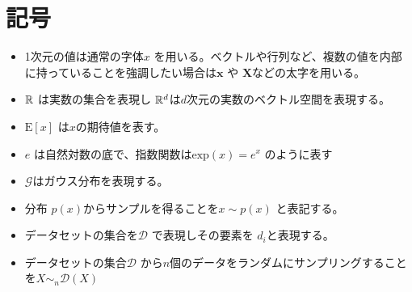 \chapter*{記号}
\label{thanks}


\begin{itemize}
    \item 1次元の値は通常の字体$ x $ を用いる。ベクトルや行列など、複数の値を内部に持っていることを強調したい場合は$ \mathbf{x} $ や $ \mathbf{X} $などの太字を用いる。
    \item $\mathbb{R}$ は実数の集合を表現し $\mathbb{R}^d$は$ d $次元の実数のベクトル空間を表現する。 
    \item $\mathrm{E}[x]$ は$x$の期待値を表す。
    \item $e$ は自然対数の底で、指数関数は$\mathrm{exp}(x) = e^x$ のように表す
    \item $ \mathcal{G} $はガウス分布を表現する。
    \item 分布 $p(x)$からサンプルを得ることを$ x \sim p(x) $ と表記する。
    \item データセットの集合を$ \mathcal{D} $ で表現しその要素を $ d_i $と表現する。
    \item データセットの集合$ \mathcal{D} $ から$ n $個のデータをランダムにサンプリングすることを$ X \sim_n \mathcal{D}(X) $ 

\end{itemize}